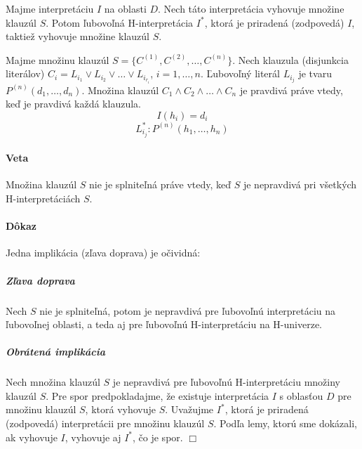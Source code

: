 \begin{lema}
    Majme interpretáciu $I$ na oblasti $D$. Nech táto interpretácia
    vyhovuje množine klauzúl $S$. Potom ľubovoľná H-interpretácia $I^*$,
    ktorá je priradená (zodpovedá) $I$, taktiež vyhovuje množine klauzúl $S$.
\end{lema}

\startFIXME
\begin{dokaz}
Majme množinu klauzúl $S=\{C^{(1)}, C^{(2)}, \ldots , C^{(n)}\}$. Nech
klauzula (disjunkcia literálov) $C_i = L_{i_1} \lor L_{i_2} \lor \ldots \lor
L_{i_{r_i}}$, $i=1,\ldots,n$. Ľubovoľný literál $L_{i_j}$ je tvaru $P^{(n)}(d_1,
\ldots, d_n)$. Množina klauzúl $C_1 \land C_2 \land \ldots \land C_n$ je
pravdivá práve vtedy, keď je pravdivá každá klauzula.
$$I(h_i) = d_i$$
$$L^*_{i_j}: P^{(n)}(h_1, \ldots, h_n)$$
\end{dokaz}

\paragraph{Veta} Množina klauzúl $S$ nie je splniteľná práve vtedy, keď $S$ je
nepravdivá pri všetkých H-interpretáciách $S$. 

\paragraph{Dôkaz} Jedna implikácia (zľava doprava) je očividná:

\subparagraph{Zľava doprava} Nech $S$ nie je splniteľná, potom je nepravdivá pre ľubovoľnú interpretáciu
na ľubovoľnej oblasti, a teda aj pre ľubovoľnú H-interpretáciu na H-univerze.

\subparagraph{Obrátená implikácia} Nech množina klauzúl $S$ je nepravdivá pre
ľubovoľnú H-interpretáciu množiny klauzúl $S$. Pre spor predpokladajme, že
existuje interpretácia $I$ s oblasťou $D$ pre množinu klauzúl $S$, ktorá
vyhovuje $S$. Uvažujme $I^*$, ktorá je priradená (zodpovedá) interpretácii pre
množinu klauzúl $S$. Podľa lemy, ktorú sme dokázali, ak vyhovuje $I$, vyhovuje
aj $I^*$, čo je spor. $\Box$

